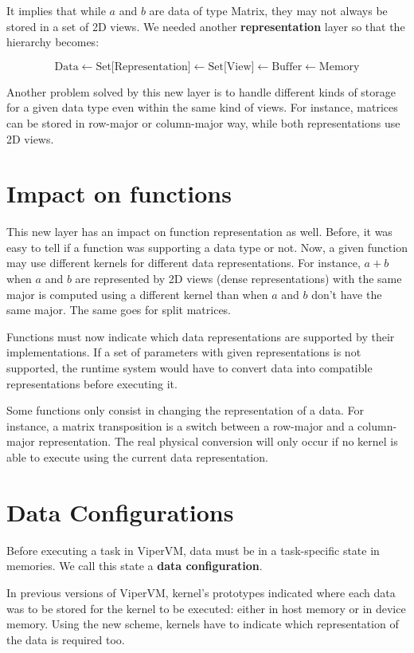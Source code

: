 It implies that while $a$ and $b$ are data of type Matrix, they may not always
be stored in a set of 2D views. We needed another \textbf{representation} layer
so that the hierarchy becomes:

\[\text{Data} \leftarrow \text{Set[Representation]} \leftarrow \text{Set[View]}
\leftarrow \text{Buffer} \leftarrow \text{Memory}\]

Another problem solved by this new layer is to handle different kinds of storage
for a given data type even within the same kind of views. For instance, matrices
can be stored in row-major or column-major way, while both representations use
2D views.

\section{Impact on functions}
This new layer has an impact on function representation as well. Before, it was
easy to tell if a function was supporting a data type or not. Now, a given
function may use different kernels for different data representations. For
instance, $a+b$ when $a$ and $b$ are represented by 2D views (dense
representations) with the same major is computed using a different kernel than
when $a$ and $b$ don't have the same major. The same goes for split matrices.

Functions must now indicate which data representations are supported by their
implementations. If a set of parameters with given representations is not
supported, the runtime system would have to convert data into compatible
representations before executing it. 

Some functions only consist in changing the representation of a data. For
instance, a matrix transposition is a switch between a row-major and a
column-major representation. The real physical conversion will only occur if no
kernel is able to execute using the current data representation.

\section{Data Configurations}
Before executing a task in ViperVM, data must be in a task-specific state in
memories. We call this state a \textbf{data configuration}.

In previous versions of ViperVM, kernel's prototypes indicated where each data
was to be stored for the kernel to be executed: either in host memory or in
device memory. Using the new scheme, kernels have to indicate which
representation of the data is required too.

